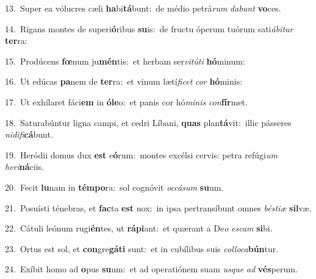 {\numbfont\textcolor{\numbcolor}{13.}}~Super ea vólucres cæli \textbf{ha}\-bi\-\textbf{tá}\-bunt:~\star de médio petrá\textit{rum} \textit{da}\-\textit{bunt} \textbf{vo}\-ces.\par
{\numbfont\textcolor{\numbcolor}{14.}}~Rigans montes de superi\-\textbf{ó}\-ribus \textbf{su}\-is:~\star de fructu óperum tuórum sati\-\textit{á}\-\textit{bi}\textit{tur} \textbf{ter}\-ra:\par
{\numbfont\textcolor{\numbcolor}{15.}}~Prodúcens \textbf{fœ}\-num ju\-\textbf{mén}\-tis:~\star et herbam ser\-\textit{vi}\-\textit{tú}\textit{ti} \textbf{hó}\-minum:\par
{\numbfont\textcolor{\numbcolor}{16.}}~Ut edúcas \textbf{pa}\-nem de \textbf{ter}\-ra:~\star et vinum lætí\-\textit{fi}\-\textit{cet} \textit{cor} \textbf{hó}\-minis:\par
{\numbfont\textcolor{\numbcolor}{17.}}~Ut exhílaret fáci\textbf{em} in \textbf{ó}\-\textbf{le}o:~\star et panis cor hó\-\textit{mi}\-\textit{nis} \textit{con}\-\textbf{fír}met.\par
{\numbfont\textcolor{\numbcolor}{18.}}~Saturabúntur ligna campi, et cedri Líbani, \textbf{quas} plan\-\textbf{tá}\-vit:~\star illic pásseres \textit{ni}\-\textit{di}\textit{fi}\textbf{cá}bunt.\par
{\numbfont\textcolor{\numbcolor}{19.}}~Heródii domus dux \textbf{est} e\-\textbf{ó}\-rum:~\star montes excélsi cervis: petra refúgi\textit{um} \textit{he}\-\textit{ri}\textbf{ná}ciis.\par
{\numbfont\textcolor{\numbcolor}{20.}}~Fecit \textbf{lu}\-nam in \textbf{tém}\-\textbf{po}ra:~\star sol cognóvit \textit{oc}\-\textit{cá}\textit{sum} \textbf{su}\-um.\par
{\numbfont\textcolor{\numbcolor}{21.}}~Posuísti ténebras, et \textbf{fac}\-ta \textbf{est} nox:~\star in ipsa pertransíbunt omnes \textit{bés}\-\textit{ti}\textit{æ} \textbf{sil}\-væ.\par
{\numbfont\textcolor{\numbcolor}{22.}}~Cátuli leónum rugi\-\textbf{én}\-tes, ut \textbf{rá}\-\textbf{pi}ant:~\star et quærant a De\textit{o} \textit{es}\-\textit{cam} \textbf{si}\-bi.\par
{\numbfont\textcolor{\numbcolor}{23.}}~Ortus est sol, et \textbf{con}\-gre\-\textbf{gá}\-\textbf{ti} sunt:~\star et in cubílibus suis \textit{col}\-\textit{lo}\textit{ca}\textbf{bún}tur.\par
{\numbfont\textcolor{\numbcolor}{24.}}~Exíbit homo ad \textbf{o}\-pus \textbf{su}\-um:~\star et ad operatiónem suam \textit{us}\-\textit{que} \textit{ad} \textbf{vés}\-perum.\par
